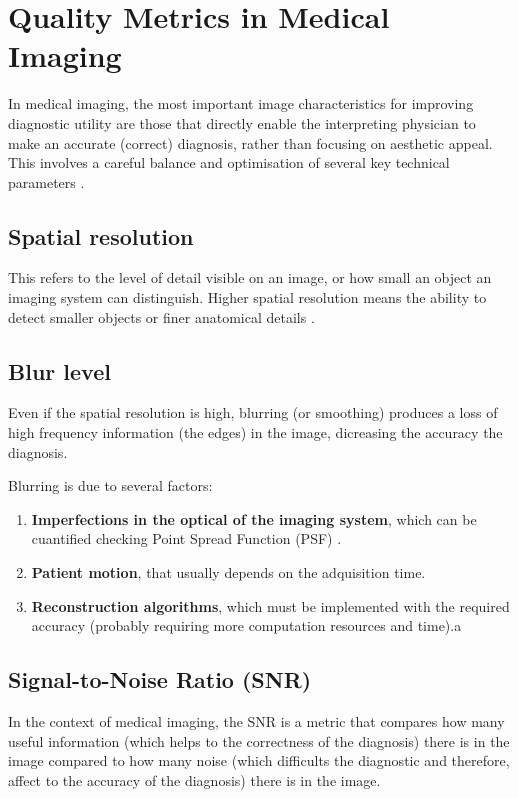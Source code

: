 \chapter{Quality Metrics in Medical Imaging}

In medical imaging, the most important image characteristics for
improving diagnostic utility are those that directly enable the
interpreting physician to make an accurate (correct) diagnosis, rather
than focusing on aesthetic appeal. This involves a careful balance and
optimisation of several key technical parameters
\cite{bushberg2011essential}.

\section{Spatial resolution}
This refers to the level of detail visible on an image, or how small
an object an imaging system can distinguish. Higher spatial resolution
means the ability to detect smaller objects or finer anatomical
details \cite{bushberg2011essential}.

\section{Blur level}
Even if the spatial resolution is high, blurring (or smoothing) produces
a loss of high frequency information (the edges) in the image,
dicreasing the accuracy the diagnosis.

Blurring is due to several factors:
\begin{enumerate}
\item \textbf{Imperfections in the optical of the imaging system}, which can be
  cuantified checking Point Spread Function (PSF)
  \cite{bushberg2011essential}.
\item \textbf{Patient motion}, that usually depends on the adquisition
  time.
\item \textbf{Reconstruction algorithms}, which must be implemented
  with the required accuracy (probably requiring more computation
  resources and time).a
\end{enumerate}

\section{Signal-to-Noise Ratio (SNR)}
In the context of medical imaging, the SNR is a metric that compares
how many useful information (which helps to the correctness of the
diagnosis) there is in the image compared to how many noise (which
difficults the diagnostic and therefore, affect to the accuracy of the
diagnosis) there is in the image.

